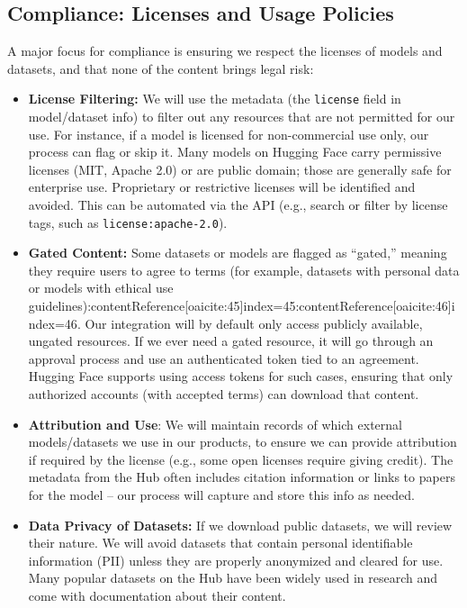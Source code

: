 \documentclass{article}
\begin{document}
\subsection*{Compliance: Licenses and Usage Policies}
A major focus for compliance is ensuring we respect the licenses of models and datasets, and that none of the content brings legal risk:
\begin{itemize}
    \item \textbf{License Filtering:} We will use the metadata (the \texttt{license} field in model/dataset info) to filter out any resources that are not permitted for our use. For instance, if a model is licensed for non-commercial use only, our process can flag or skip it. Many models on Hugging Face carry permissive licenses (MIT, Apache 2.0) or are public domain; those are generally safe for enterprise use. Proprietary or restrictive licenses will be identified and avoided. This can be automated via the API (e.g., search or filter by license tags, such as \texttt{license:apache-2.0}).
    \item \textbf{Gated Content:} Some datasets or models are flagged as “gated,” meaning they require users to agree to terms (for example, datasets with personal data or models with ethical use guidelines):contentReference[oaicite:45]{index=45}:contentReference[oaicite:46]{index=46}. Our integration will by default only access publicly available, ungated resources. If we ever need a gated resource, it will go through an approval process and use an authenticated token tied to an agreement. Hugging Face supports using access tokens for such cases, ensuring that only authorized accounts (with accepted terms) can download that content.
    \item \textbf{Attribution and Use}: We will maintain records of which external models/datasets we use in our products, to ensure we can provide attribution if required by the license (e.g., some open licenses require giving credit). The metadata from the Hub often includes citation information or links to papers for the model – our process will capture and store this info as needed.
    \item \textbf{Data Privacy of Datasets:} If we download public datasets, we will review their nature. We will avoid datasets that contain personal identifiable information (PII) unless they are properly anonymized and cleared for use. Many popular datasets on the Hub have been widely used in research and come with documentation about their content.
\end{itemize}
\end{document}

